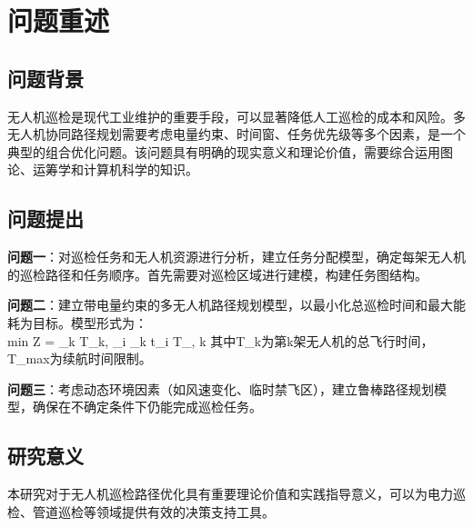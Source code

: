 \newpage
\section{问题重述}

\subsection{问题背景}
无人机巡检是现代工业维护的重要手段，可以显著降低人工巡检的成本和风险。多无人机协同路径规划需要考虑电量约束、时间窗、任务优先级等多个因素，是一个典型的组合优化问题。该问题具有明确的现实意义和理论价值，需要综合运用图论、运筹学和计算机科学的知识。

\subsection{问题提出}
\textbf{问题一}：对巡检任务和无人机资源进行分析，建立任务分配模型，确定每架无人机的巡检路径和任务顺序。首先需要对巡检区域进行建模，构建任务图结构。

\textbf{问题二}：建立带电量约束的多无人机路径规划模型，以最小化总巡检时间和最大能耗为目标。模型形式为：
\\min \quad Z = \max_k T_k, \quad {} \quad \sum_{i \in {}_k} t_i \leq T_{\max}, \; \forall k
其中T_k为第k架无人机的总飞行时间，T_max为续航时间限制。

\textbf{问题三}：考虑动态环境因素（如风速变化、临时禁飞区），建立鲁棒路径规划模型，确保在不确定条件下仍能完成巡检任务。

\subsection{研究意义}
本研究对于无人机巡检路径优化具有重要理论价值和实践指导意义，可以为电力巡检、管道巡检等领域提供有效的决策支持工具。
